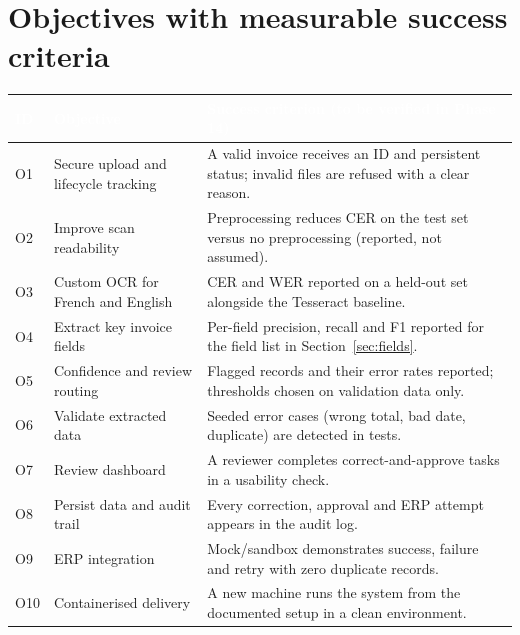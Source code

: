 \documentclass[11pt,a4paper]{report}
\newcommand{\hdr}[1]{\textcolor{white}{\sffamily\bfseries #1}}
\newcommand{\tblstart}{\rowcolors{2}{white}{rowgray}\arrayrulecolor{teal!60}}
\newcommand{\hdrrow}{\rowcolor{navy}}
\begin{document}
\section{Objectives with measurable success criteria}
{\tblstart\small
\begin{longtable}{L{1.0cm}L{5.4cm}L{7.3cm}}
\hdrrow \hdr{ID} & \hdr{Objective} & \hdr{Success criterion (to be verified in Phase 14)}\\ \endhead
O1 & Secure upload and lifecycle tracking & A valid invoice receives an ID and persistent status; invalid files are refused with a clear reason.\\
O2 & Improve scan readability & Preprocessing reduces CER on the test set versus no preprocessing (reported, not assumed).\\
O3 & Custom OCR for French and English & CER and WER reported on a held-out set alongside the Tesseract baseline.\\
O4 & Extract key invoice fields & Per-field precision, recall and F1 reported for the field list in Section~\ref{sec:fields}.\\
O5 & Confidence and review routing & Flagged records and their error rates reported; thresholds chosen on validation data only.\\
O6 & Validate extracted data & Seeded error cases (wrong total, bad date, duplicate) are detected in tests.\\
O7 & Review dashboard & A reviewer completes correct-and-approve tasks in a usability check.\\
O8 & Persist data and audit trail & Every correction, approval and ERP attempt appears in the audit log.\\
O9 & ERP integration & Mock/sandbox demonstrates success, failure and retry with zero duplicate records.\\
O10 & Containerised delivery & A new machine runs the system from the documented setup in a clean environment.\\
\hline
\end{longtable}}
\end{document}

